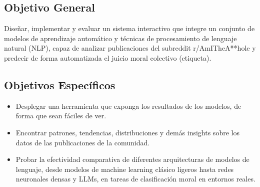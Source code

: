 \subsection{Objetivo General}
Diseñar, implementar y evaluar un sistema interactivo que integre un conjunto de modelos de aprendizaje automático y técnicas de procesamiento de lenguaje natural (NLP), capaz de analizar publicaciones del subreddit r/AmITheA**hole y predecir de forma automatizada el juicio moral colectivo (etiqueta).

\subsection{Objetivos Específicos}

\begin{itemize}
    \item Desplegar una herramienta que exponga los resultados de los modelos, de forma que sean fáciles de ver.
    \item Encontrar patrones, tendencias, distribuciones y demás insights sobre los datos de las publicaciones de la comunidad.
    \item Probar la efectividad comparativa de diferentes arquitecturas de modelos de lenguaje, desde modelos de machine learning clásico ligeros hasta redes neuronales densas y LLMs, en tareas de clasificación moral en entornos reales.
\end{itemize}